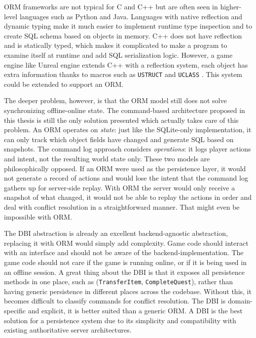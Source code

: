 \documentclass{article}
\begin{document}
ORM frameworks are not typical for C and C++ but are often seen in higher-level languages such as Python and Java. Languages with native reflection and dynamic typing make it much easier to implement runtime type inspection and to create SQL schema based on objects in memory. C++ does not have reflection and is statically typed, which makes it complicated to make a program to examine itself at runtime and add SQL serialization logic. However, a game engine like Unreal engine extends C++ with a reflection system, each object has extra information thanks to macros such as \texttt{USTRUCT} and \texttt{UCLASS} \autocite{unreal}. This system could be extended to support an ORM.

The deeper problem, however, is that the ORM model still does not solve synchronizing offline-online state. The command-based architecture proposed in this thesis is still the only solution presented which actually takes care of this problem. An ORM operates on \emph{state}: just like the SQLite-only implementation, it can only track which object fields have changed and generate SQL based on snapshots. The command log approach considers \emph{operations}: it logs player actions and intent, not the resulting world state only. These two models are philosophically opposed. If an ORM were used as the persistence layer, it would not generate a record of actions and would lose the intent that the command log gathers up for server-side replay. With ORM the server would only receive a snapshot of what changed, it would not be able to replay the actions in order and deal with conflict resolution in a straightforward manner. That might even be impossible with ORM.

The DBI abstraction is already an excellent backend-agnostic abstraction, replacing it with ORM would simply add complexity. Game code should interact with an interface and should not be aware of the backend-implementation. The game code should not care if the game is running online, or if it is being used in an offline session. A great thing about the DBI is that it exposes all persistence methods in one place, such as (\texttt{TransferItem}, \texttt{CompleteQuest}), rather than having generic persistence in different places across the codebase. Without this, it becomes difficult to classify commands for conflict resolution. The DBI is domain-specific and explicit, it is better suited than a generic ORM. A DBI is the best solution for a persistence system due to its simplicity and compatibility with existing authoritative server architectures.
\end{document}
